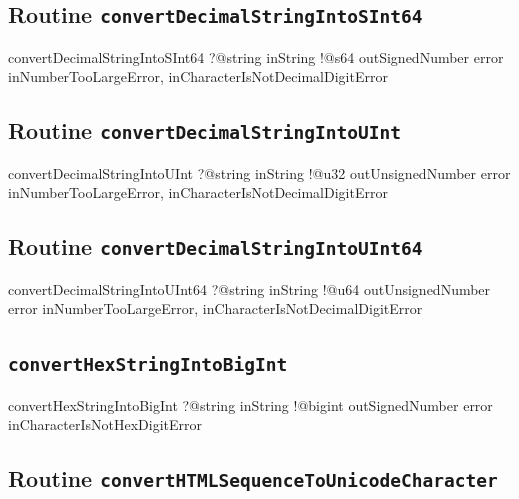 \subsection{Routine \texttt{convertDecimalStringIntoSInt64}}

\begin{galgas4}
convertDecimalStringIntoSInt64 ?@string inString
                               !@s64 outSignedNumber
                               error inNumberTooLargeError,
                                     inCharacterIsNotDecimalDigitError
\end{galgas4}

\subsection{Routine \texttt{convertDecimalStringIntoUInt}}

\begin{galgas4}
convertDecimalStringIntoUInt ?@string inString
                             !@u32 outUnsignedNumber
                             error inNumberTooLargeError,
                                   inCharacterIsNotDecimalDigitError
\end{galgas4}

\subsection{Routine \texttt{convertDecimalStringIntoUInt64}}

\begin{galgas4}
convertDecimalStringIntoUInt64 ?@string inString
                               !@u64 outUnsignedNumber
                               error inNumberTooLargeError,
                                     inCharacterIsNotDecimalDigitError
\end{galgas4}

\subsection{\texttt{convertHexStringIntoBigInt}}

\begin{galgas4}
convertHexStringIntoBigInt ?@string inString
                           !@bigint outSignedNumber
                           error inCharacterIsNotHexDigitError
\end{galgas4}



\subsection{Routine \texttt{convertHTMLSequenceToUnicodeCharacter}}

